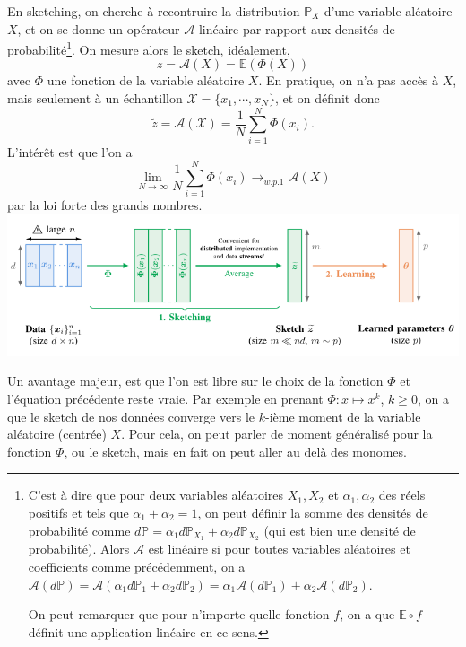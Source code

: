 \documentclass[11pt]{article} %
\begin{document}
\par
En sketching, on cherche à recontruire la distribution $\mathbb{P}_X$ d'une variable aléatoire $X$, et on se donne un opérateur $\mathcal{A}$ linéaire par rapport aux densités de probabilité\footnote{C'est à dire que pour deux variables aléatoires $X_1,X_2$ et $\alpha_1,\alpha_2$ des réels positifs et tels que $\alpha_1 + \alpha_2 = 1$, on peut définir la somme des densités de probabilité comme $d\mathbb{P} = \alpha_1d\mathbb{P}_{X_1} + \alpha_2d\mathbb{P}_{X_2}$ (qui est bien une densité de probabilité). Alors $\mathcal{A}$ est linéaire si pour toutes variables aléatoires et coefficients comme précédemment, on a 
$\mathcal{A}(d\mathbb{P}) = \mathcal{A}(\alpha_1d\mathbb{P}_1 + \alpha_2d\mathbb{P}_2) = \alpha_1\mathcal{A}(d\mathbb{P}_1) + \alpha_2\mathcal{A}(d\mathbb{P}_2)$. \newline

On peut remarquer que pour n'importe quelle fonction $f$, on a que $\mathbb{E}\circ f$ définit une application linéaire en ce sens.}. On mesure alors le sketch, idéalement,
\begin{equation}
	z = \mathcal{A}(X) = \mathbb{E}(\Phi(X))
\end{equation}
avec $\Phi$ une fonction de la variable aléatoire $X$.
 En pratique, on n'a pas accès à $X$, mais seulement à un échantillon $\mathcal{X} =\{x_1,\cdots, x_N\}$, et on définit donc
\begin{equation}
	\tilde z = \mathcal{A}(\mathcal{X}) = \frac{1}{N}\sum_{i=1}^N \Phi(x_i).
\end{equation}
L'intérêt est que l'on a
\begin{equation}
	\lim_{N\to\infty}\frac{1}{N}\sum_{i=1}^N\Phi(x_i) \to_{w.p.1} \mathcal{A}(X)
\end{equation} 
par la loi forte des grands nombres.
\newline
\includegraphics[width=\textwidth]{sketching_stream}
\par
Un avantage majeur, est que l'on est libre sur le choix de la fonction $\Phi$ et l'équation précédente reste vraie. Par exemple en prenant $\Phi: x\mapsto x^k$, $k\geq 0$, on a que le sketch de nos données converge vers le $k$-ième moment de la variable aléatoire (centrée) $X$. Pour cela, on peut parler de moment généralisé pour la fonction $\Phi$, ou le sketch, mais en fait on peut aller au delà des monomes.
\end{document}
